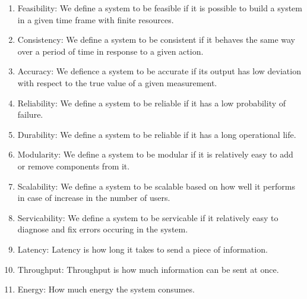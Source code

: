 \begin{enumerate}
	\item Feasibility: We define a system to be feasible if it is possible to build a system in a given time frame with finite resources.
	\item Consistency: We define a system to be consistent if it behaves the same way over a period of time in response to a given action.
	\item Accuracy: We defience a system to be accurate if its output has low deviation with respect to the true value of a given measurement.
	\item Reliability: We define a system to be reliable if it has a low probability of failure.
	\item Durability: We define a system to be reliable if it has a long operational life.
	\item Modularity: We define a system to be modular if it is relatively easy to add or remove components from it.
	\item Scalability: We define a system to be scalable based on how well it performs in case of increase in the number of users.
	\item Servicability: We define a system to be servicable if it relatively easy to diagnose and fix errors occuring in the system.
	\item Latency: Latency is how long it takes to send a piece of information.
	\item Throughput: Throughput is how much information can be sent at once.
	\item Energy: How much energy the system consumes.
\end{enumerate}


